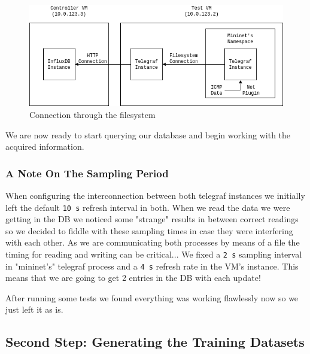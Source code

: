 \documentclass[12pt]{report}
\newcommand{\newpar} {
    \vskip 1cm
}
\begin{document}
				\begin{figure}
					\centering
					\includegraphics[scale = 1]{telegraf_connections.png}
					\caption{Connection through the filesystem}
					\label{f:telegraf_connections}
				\end{figure}

				We are now ready to start querying our database and begin working with the acquired information.

			\subsubsection{A Note On The Sampling Period}
				When configuring the interconnection between both telegraf instances we initially left the default \texttt{10 s} refresh interval in both. When we read the data we were getting in the DB we noticed some "strange" results in between correct readings so we decided to fiddle with these sampling times in case they were interfering with each other. As we are communicating both processes by means of a file the timing for reading and writing can be critical... We fixed a \texttt{2 s} sampling interval in "mininet's" telegraf process and a \texttt{4 s} refresh rate in the VM's instance. This means that we are going to get 2 entries in the DB with each update!
				\newpar
				After running some tests we found everything was working flawlessly now   so we just left it as is.

		\subsection{Second Step: Generating the Training Datasets}
\end{document}
